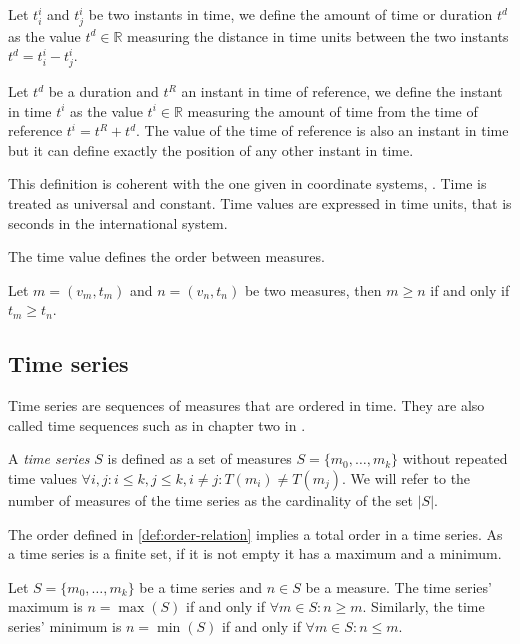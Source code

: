 \begin{definition}[Time]
  \label{def:time}
  Let $t^i_i$ and $t^i_j$ be two instants in time, we define the
  amount of time or duration $t^d$ as the value $t^d \in\mathbb{R}$
  measuring the distance in time units between the two instants $t^d =
  t^i_i - t^i_j$.

  Let $t^d$ be a duration and $t^{R}$ an instant in time of reference,
  we define the instant in time $t^i$ as the value $t^i \in\mathbb{R}$
  measuring the amount of time from the time of reference $t^i= t^{R}
  + t^d$. The value of the time of reference is also an instant in
  time but it can define exactly the position of any other instant in
  time.

  This definition is coherent with the one given in coordinate
  systems, \cite{wiki:coordinate}.  Time is treated as universal and
  constant. Time values are expressed in time units, that is seconds
  in the international system.
\end{definition}

The time value defines the order between measures.

\begin{definition}
  \label{def:order-relation}
  Let $m=(v_m,t_m)$ and $n=(v_n,t_n)$ be two measures, then $m\geq n$
  if and only if $t_m\geq t_n$.
\end{definition}

\subsection{Time series}

Time series are sequences of measures that are ordered in time. They
are also called time sequences such as in chapter two in \cite{last}.

\begin{definition}
  A \emph{time series} $S$ is defined as a set of measures
  $S=\{m_0,\ldots,m_k\}$ without repeated time values $\forall i,j:
  i\leq k, j\leq k, i\neq j : T(m_i)\neq T(m_j)$. We will refer to the
  number of measures of the time series as the cardinality of the set
  $|S|$.
\end{definition}

The order defined in \ref{def:order-relation} implies a total order in
a time series. As a time series is a finite set, if it is not empty it
has a maximum and a minimum. 

\begin{definition}
  Let $S=\{m_0,\ldots,m_k\}$ be a time series and $n\in S$ be a
  measure. The time series' maximum is $n=\max(S)$ if and only if
  $\forall m \in S: n \geq m $.  Similarly, the time series' minimum
  is $n=\min(S)$ if and only if $\forall m \in S: n \leq m$.
\end{definition}

